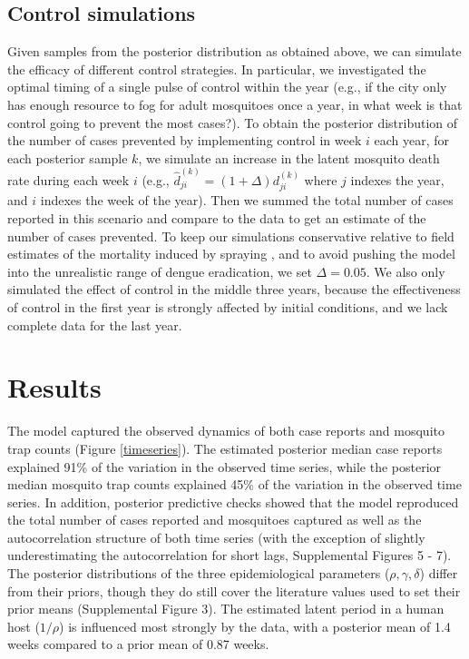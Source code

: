 \documentclass[10pt,letterpaper]{article}
\begin{document}
\subsection*{Control simulations}

Given samples from the posterior distribution as obtained above, we can simulate the efficacy of different control strategies.
In particular, we investigated the optimal timing of a single pulse of control within the year (e.g., if the city only has enough resource to fog for adult mosquitoes once a year, in what week is that control going to prevent the most cases?).
To obtain the posterior distribution of the number of cases prevented by implementing control in week $i$ each year, for each posterior sample $k$, we simulate an increase in the latent mosquito death rate during each week $i$ (e.g.,
$\hat{d}^{(k)}_{ji} = (1 + \Delta) d^{(k)}_{ji}$ where $j$ indexes the year, and $i$ indexes the week of the year).
Then we summed the total number of cases reported in this scenario and compare to the data to get an estimate of the number of cases prevented.
To keep our simulations conservative relative to field estimates of the mortality induced by spraying \cite{Esu2010}, and to avoid pushing the model into the unrealistic range of dengue eradication, we set $\Delta = 0.05$.
We also only simulated the effect of control in the middle three years, because the effectiveness of control in the first year is strongly affected by initial conditions, and we lack complete data for the last year.

\section*{Results}

The model captured the observed dynamics of both case reports and mosquito trap counts (Figure \ref{timeseries}).
The estimated posterior median case reports explained 91\% of the variation in the observed time series, while the posterior median mosquito trap counts explained 45\% of the variation in the observed time series. 
In addition, posterior predictive checks showed that the model reproduced the total number of cases reported and mosquitoes captured as well as the autocorrelation structure of both time series (with the exception of slightly underestimating the autocorrelation for short lags, Supplemental Figures 5 - 7).
The posterior distributions of the three epidemiological parameters ($\rho, \gamma, \delta$) differ from their priors, though they do still cover the literature values used to set their prior means (Supplemental Figure 3).
The estimated latent period in a human host ($1/\rho$) is influenced most strongly by the data, with a posterior mean of 1.4 weeks compared to a prior mean of 0.87 weeks.
\end{document}
